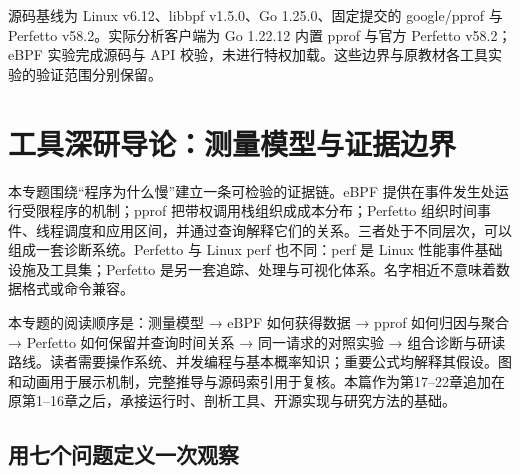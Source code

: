 \documentclass[UTF8,fontset=fandol,openany,11pt]{ctexbook}
\begin{document}
源码基线为 Linux v6.12、libbpf v1.5.0、Go 1.25.0、固定提交的 google/pprof 与 Perfetto v58.2。实际分析客户端为 Go 1.22.12 内置 pprof 与官方 Perfetto v58.2；eBPF 实验完成源码与 API 校验，未进行特权加载。这些边界与原教材各工具实验的验证范围分别保留。

\chapter{工具深研导论：测量模型与证据边界}
\label{ch:17}

本专题围绕“程序为什么慢”建立一条可检验的证据链。eBPF 提供在事件发生处运行受限程序的机制；pprof 把带权调用栈组织成成本分布；Perfetto 组织时间事件、线程调度和应用区间，并通过查询解释它们的关系。三者处于不同层次，可以组成一套诊断系统。Perfetto 与 Linux perf 也不同：perf 是 Linux 性能事件基础设施及工具集；Perfetto 是另一套追踪、处理与可视化体系。名字相近不意味着数据格式或命令兼容。


本专题的阅读顺序是：测量模型 →\allowbreak{} eBPF 如何获得数据 →\allowbreak{} pprof 如何归因与聚合 →\allowbreak{} Perfetto 如何保留并查询时间关系 →\allowbreak{} 同一请求的对照实验 →\allowbreak{} 组合诊断与研读路线。读者需要操作系统、并发编程与基本概率知识；重要公式均解释其假设。图和动画用于展示机制，完整推导与源码索引用于复核。本篇作为第17–22章追加在原第1–16章之后，承接运行时、剖析工具、开源实现与研究方法的基础。


\section{用七个问题定义一次观察}
\end{document}
